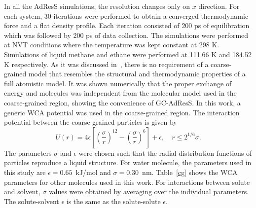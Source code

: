 \documentclass[a4paper,preprint,unsortedaddress]{revtex4-1}
\begin{document}
In all the AdResS simulations, the resolution changes only on $x$ direction.
For each system, 30 iterations were performed to obtain a 
converged thermodynamic force and a flat density profile. Each iteration consisted 
of 200 ps of equilibration which was followed by 200 ps of data collection. 
The simulations were performed at NVT conditions where the temperature was kept constant 
at 298 K. Simulations of liquid methane and ethane were performed at
111.66 K and 184.52 K respectively. {As it was discussed in~\cite{prx}, there is no requirement 
of a coarse-grained model that resembles the structural and thermodynamic properties of a full atomistic
model. It was shown numerically that the proper exchange of energy and molecules was independent from the 
molecular model used in the coarse-grained region, showing the convenience of GC-AdResS. In this work, a generic WCA potential was used in the 
coarse-grained region. The interaction potential between the coarse-grained particles is given by 
\begin{equation}
  U(r) = 4 \epsilon \left[\left(\frac{\sigma}{r}\right)^{12} - \left(\frac{\sigma}{r}\right)^{6}\right] + \epsilon,
  \quad
  r \leq 2^{1/6}\sigma. 
\end{equation}
The parameters $\sigma$ and $\epsilon$ were chosen such that the radial distribution functions of particles 
reproduce a liquid structure. For water molecule, the parameters used in this study are $\epsilon=0.65$~kJ/mol
and $\sigma=0.30$~nm. Table~\ref{cg} shows the WCA parameters for other molecules used in this work.
For interactions between solute and solvent, $\sigma$ values were obtained by 
averaging over the individual parameters.
The solute-solvent $\epsilon$ is the same as the solute-solute  $\epsilon$.
\\
}
\end{document}
